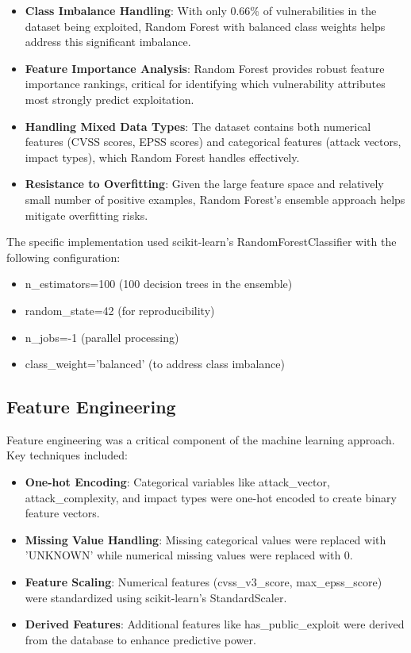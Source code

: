 \documentclass[runningheads]{llncs}
\begin{document}
\begin{itemize}
    \item \textbf{Class Imbalance Handling}: With only 0.66\% of vulnerabilities in the dataset being exploited, Random Forest with balanced class weights helps address this significant imbalance.
    
    \item \textbf{Feature Importance Analysis}: Random Forest provides robust feature importance rankings, critical for identifying which vulnerability attributes most strongly predict exploitation.
    
    \item \textbf{Handling Mixed Data Types}: The dataset contains both numerical features (CVSS scores, EPSS scores) and categorical features (attack vectors, impact types), which Random Forest handles effectively.
    
    \item \textbf{Resistance to Overfitting}: Given the large feature space and relatively small number of positive examples, Random Forest's ensemble approach helps mitigate overfitting risks.
\end{itemize}

The specific implementation used scikit-learn's RandomForestClassifier with the following configuration:

\begin{itemize}
    \item n\_estimators=100 (100 decision trees in the ensemble)
    \item random\_state=42 (for reproducibility)
    \item n\_jobs=-1 (parallel processing)
    \item class\_weight='balanced' (to address class imbalance)
\end{itemize}

\subsection{Feature Engineering}
Feature engineering was a critical component of the machine learning approach. Key techniques included:

\begin{itemize}
    \item \textbf{One-hot Encoding}: Categorical variables like attack\_vector, attack\_complexity, and impact types were one-hot encoded to create binary feature vectors.
    
    \item \textbf{Missing Value Handling}: Missing categorical values were replaced with 'UNKNOWN' while numerical missing values were replaced with 0.
    
    \item \textbf{Feature Scaling}: Numerical features (cvss\_v3\_score, max\_epss\_score) were standardized using scikit-learn's StandardScaler.
    
    \item \textbf{Derived Features}: Additional features like has\_public\_exploit were derived from the database to enhance predictive power.
\end{itemize}
\end{document}

